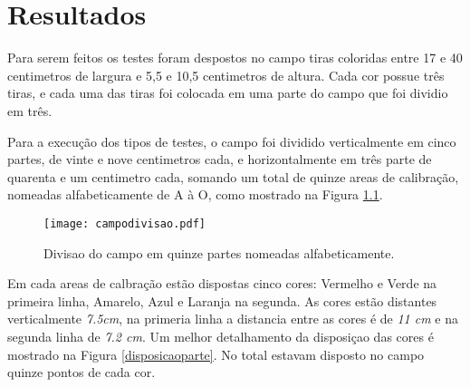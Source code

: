 \chapter{Resultados} 


	Para serem feitos os testes foram despostos no campo tiras coloridas entre 17 e 40 centimetros de largura e  5,5 e 10,5 centimetros de altura. Cada cor possue três tiras, e cada uma das tiras foi colocada em uma parte do campo que foi dividio em três.


Para a execução dos tipos de testes, o campo foi dividido verticalmente em cinco partes, de vinte e nove centimetros cada, e horizontalmente em três parte de quarenta e um centimetro cada, somando um total de quinze areas de calibração, nomeadas alfabeticamente de A à O, como mostrado na Figura \ref{campodivisao}.

\begin{figure}[!: h]
		\centering
		\texttt{[image: campodivisao.pdf]}
		\caption{Divisao do campo em quinze partes nomeadas alfabeticamente.}
		\label{campodivisao}
	\end{figure}
	
Em cada areas de calbração estão dispostas cinco cores: Vermelho  e Verde na primeira linha, Amarelo, Azul e Laranja na segunda. As cores estão distantes verticalmente \textit{7.5cm}, na primeria linha a distancia entre as cores é  de \textit{11 cm} e na segunda linha de \textit{7.2 cm}. Um  melhor detalhamento da disposiçao das cores é  mostrado na Figura \ref{disposicaoparte}. No total estavam disposto no campo quinze pontos de cada cor.


